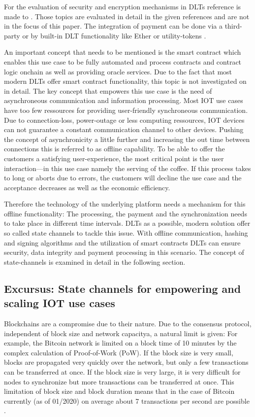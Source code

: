 \documentclass[conference]{IEEEtran}
\begin{document}
For the evaluation of security and encryption mechanisms in DLTs reference is made to \cite{XYZ}. Those topics are evaluated in detail in the given references and are not in the focus of this paper. The integration of payment can be done via a third-party or by built-in DLT functionality like Ether or utility-tokens \cite{XYZ}.

An important concept that needs to be mentioned is the smart contract which enables this use case to be fully automated and process contracts and contract logic onchain as well as providing oracle services. Due to the fact that most modern DLTs offer smart contract functionality, this topic is not investigated on in detail. The key concept that empowers this use case is the need of asynchroneous communication and information processing. Most IOT use cases have too few ressources for providing user-friendly synchroneous communication. Due to connection-loss, power-outage or less computing ressources, IOT devices can not guarantee a constant communication channel to other devices. Pushing the concept of asynchronicity a little further and increasing the out time between connections this is referred to as offline capability. To be able to offer the customers a satisfying user-experience, the most critical point is the user interaction---in this use case namely the serving of the coffee. If this process takes to long or aborts due to errors, the customers will decline the use case and the acceptance decreases as well as the economic efficiency.

Therefore the technology of the underlying platform needs a mechanism for this offline functionality: The processing, the payment and the synchronization needs to take place in different time intervals. DLTs as a possible, modern solution offer so called state channels to tackle this issue. With offline communication, hashing and signing algorithms and the utilization of smart contracts DLTs can ensure security, data integrity and payment processing in this scenario. The concept of state-channels is examined in detail in the following section.

\subsection{Excursus: State channels for empowering and scaling IOT use cases}
Blockchains are a compromise due to their nature. Due to the consensus protocol, independent of block size and network capacitya, a natural limit is given: For example, the Bitcoin network \cite{nakamoto2009} is limited on a block time of 10 minutes by the complex calculation of Proof-of-Work (PoW). If the block size is very small, blocks are propagated very quickly over the network, but only a few transactions can be transferred at once. If the block size is very large, it is very difficult for nodes to synchronize but more transactions can be transferred at once. This limitation of block size and block duration means that in the case of Bitcoin currently (as of 01/2020) on average about 7 transactions per second are possible \cite{Macdonald2017}.
\end{document}
